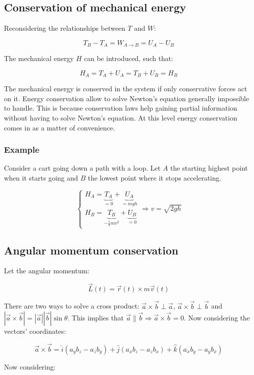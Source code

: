  \subsection{Conservation of mechanical energy}
  Reconsidering the relationships between $T$ and $W$:

  $$T_B-T_A = W_{A\rightarrow B} = U_A-U_B$$

  The mechanical energy $H$ can be introduced, such that:

  $$H_A = T_A+U_A = T_B+U_B = H_B$$

  The mechanical energy is conserved in the system if only conservative forces act on it.
  Energy conservation allow to solve Newton's equation generally impossible to handle.
  This is because conservation laws help gaining partial information without having to solve Newton's equation.
  At this level energy conservation comes in as a matter of convenience.

    \subsubsection{Example}
    Consider a cart going down a path with a loop.
    Let $A$ the starting highest point when it starts going and $B$ the lowest point where it stops accelerating.

    $$\begin{cases}H_A = \underbrace{T_A}_{=0}+\underbrace{U_A}_{=mgh}\\
    H_B = \underbrace{T_B}_{-\frac{1}{2}mv^2}+\underbrace{U_B}_{=0}\end{cases}
    \Rightarrow v = \sqrt{2gh}$$

  \subsection{Angular momentum conservation}
  Let the angular momentum:

  $$\vec{L}(t) = \vec{r}(t)\times m \vec{v}(t)$$

  There are two ways to solve a cross product: $\vec{a}\times \vec{b}\perp \vec{a}$, $\vec{a}\times \vec{b}\perp \vec{b}$ and $|\vec{a}\times \vec{b}| = |\vec{a}||\vec{b}|\sin\theta$.
  This implies that $\vec{a}\parallel \vec{b}\Rightarrow \vec{a}\times \vec{b} = 0$.
  Now considering the vectors' coordinates:

  $$\vec{a}\times \vec{b} = \hat{i}(a_yb_z - a_zb_y) + \hat{j}(a_xb_z - a_zb_x) + \hat{k}(a_xb_y-a_yb_x)$$

  Now considering:

